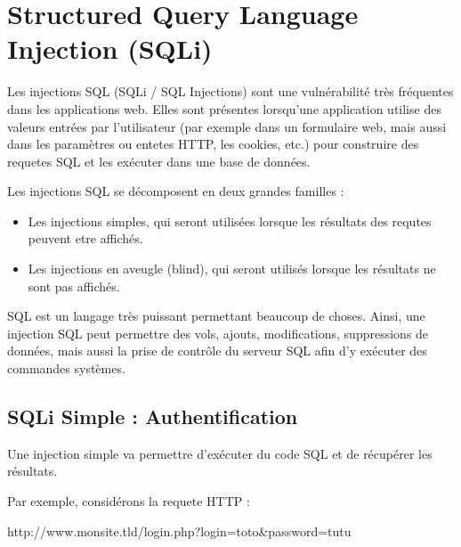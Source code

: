 

\newpage
\section{Structured Query Language Injection (SQLi)}\label{vulnerabilites:web:sqli}

Les injections SQL (SQLi / SQL Injections) sont une vulnérabilité très fréquentes dans les applications web. Elles sont présentes lorsqu'une application utilise des valeurs entrées par l'utilisateur (par exemple dans un formulaire web, mais aussi dans les paramètres ou entetes HTTP, les cookies, etc.) pour construire des requetes SQL et les exécuter dans une base de données.

\begin{tabbing}
\end{tabbing}
Les injections SQL se décomposent en deux grandes familles :
\begin{itemize}
\item Les injections simples, qui seront utilisées lorsque les résultats des requtes peuvent etre affichés.
\item Les injections en aveugle (blind), qui seront utilisés lorsque les résultats ne sont pas affichés.
\end{itemize}


\begin{tabbing}
\end{tabbing}
SQL est un langage très puissant permettant beaucoup de choses. Ainsi, une injection SQL peut permettre des vols, ajouts, modifications, suppressions de données, mais aussi la prise de contrôle du serveur SQL afin d'y exécuter des commandes systèmes.


\subsection{SQLi Simple : Authentification}\label{vulnerabilites:web:sqli:simpleauthent}

Une injection simple va permettre d'exécuter du code SQL et de récupérer les résultats.

Par exemple, considérons la requete HTTP :
\begin{tabbing}
\end{tabbing}
http://www.monsite.tld/login.php?login=toto\&password=tutu

